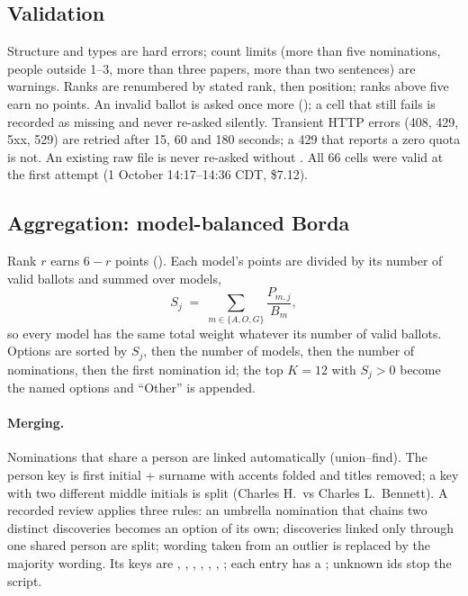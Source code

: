 \documentclass[11pt,a4paper]{article}
\newcommand{\file}[1]{\path{#1}}
\begin{document}
\subsection{Validation}

Structure and types are hard errors; count limits (more than five nominations, people outside 1--3, more than three
papers, more than two sentences) are warnings. Ranks are renumbered by stated rank, then position; ranks above five
earn no points. An invalid ballot is asked once more (); a cell that still fails is recorded as
missing and never re-asked silently. Transient HTTP errors (408, 429, 5xx, 529) are retried after 15, 60 and 180
seconds; a 429 that reports a zero quota is not. An existing raw file is never re-asked without . All 66
cells were valid at the first attempt (1 October 14:17--14:36 CDT, \$7.12).

\subsection{Aggregation: model-balanced Borda}

Rank $r$ earns $6-r$ points (). Each model's points are divided by its number of valid
ballots and summed over models,
\[
  S_j \;=\; \sum_{m\in\{A,O,G\}} \frac{P_{m,j}}{B_m},
\]
so every model has the same total weight whatever its number of valid ballots. Options are sorted by $S_j$, then the
number of models, then the number of nominations, then the first nomination id; the top $K=12$ with $S_j>0$ become the
named options and ``Other'' is appended.

\paragraph{Merging.} Nominations that share a person are linked automatically (union--find). The person key is first
initial + surname with accents folded and titles removed; a key with two different middle initials is split (Charles
H.\ vs Charles L.\ Bennett). A recorded review \file{committee/<field>/merges.yaml} applies three rules: an umbrella
nomination that chains two distinct discoveries becomes an option of its own; discoveries linked only through one
shared person are split; wording taken from an outlier is replaced by the majority wording. Its keys are ,
, , , , , ; each entry has a
; unknown ids stop the script.
\end{document}
